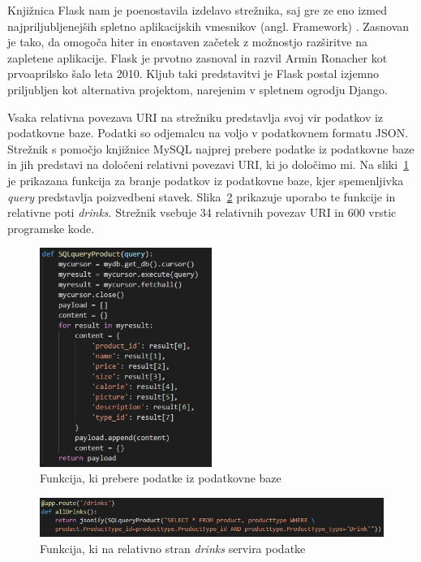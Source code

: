 \documentclass[a4paper, 12pt]{book}
\begin{document}
Knjižnica Flask nam je poenostavila izdelavo strežnika, saj gre ze eno izmed najpriljubljenejših spletno aplikacijskih vmesnikov (angl. Framework) \cite{Flask}. Zasnovan je tako, da omogoča hiter in enostaven začetek z možnostjo razširitve na zapletene aplikacije. Flask je prvotno zasnoval in razvil Armin Ronacher kot prvoaprilsko šalo leta 2010. Kljub taki predstavitvi je Flask postal izjemno priljubljen kot alternativa projektom, narejenim v spletnem ogrodju Django.

Vsaka relativna povezava URI na strežniku predstavlja svoj vir podatkov iz podatkovne baze. Podatki so odjemalcu na voljo v podatkovnem formatu JSON. Strežnik s pomočjo knjižnice MySQL najprej prebere podatke iz podatkovne baze in jih predstavi na določeni relativni povezavi URI, ki jo določimo mi. Na sliki~\ref{Drinks_DB_function} je prikazana funkcija za branje podatkov iz podatkovne baze, kjer spemenljivka \textit{query} predstavlja poizvedbeni stavek. Slika~\ref{Drinks_URI} prikazuje uporabo te funkcije in relativne poti \textit{drinks}. Strežnik vsebuje 34 relativnih povezav URI in 600 vrstic programske kode.


\begin{figure}[!htb]
\begin{center}
\includegraphics[width=0.5\textwidth]{drinks_1.jpg}
\caption{Funkcija, ki prebere podatke iz podatkovne baze}
\label{Drinks_DB_function}
\end{center}
\end{figure}

\begin{figure}[!htb]
\begin{center}
\includegraphics[width=14cm]{drinks_2.jpg}
\caption{Funkcija, ki na relativno stran \textit{drinks} servira podatke}
\label{Drinks_URI}
\end{center}
\end{figure}
\end{document}
